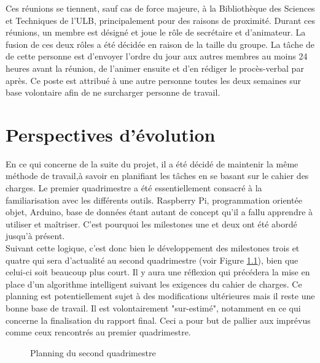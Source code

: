 \documentclass[11pt,a4paper,11pt]{report}
\begin{document}
	Ces réunions se tiennent, sauf cas de force majeure, à la Bibliothèque des Sciences et Techniques de l’ULB, principalement pour des raisons de proximité. Durant ces réunions, un membre est désigné et joue le rôle de secrétaire et d’animateur. La fusion de ces deux rôles a été décidée en raison de la taille du groupe. La tâche de de cette personne est d’envoyer l’ordre du jour aux autres membres au moins 24 heures avant la réunion, de l’animer ensuite et d’en rédiger le procès-verbal par après. Ce poste est attribué à une autre personne toutes les deux semaines sur base volontaire afin de ne surcharger personne de travail.\\
    
\newpage


\chapter{Perspectives d'évolution}

En ce qui concerne de la suite du projet, il a été décidé de maintenir la même méthode de travail,à savoir en planifiant les tâches en se basant sur le cahier des charges. Le premier quadrimestre a été essentiellement consacré à la familiarisation avec les différents outils. Raspberry Pi, programmation orientée objet, Arduino, base de données étant autant de concept qu'il a fallu apprendre à utiliser et maîtriser. C'est pourquoi les milestones une et deux ont été abordé jusqu'à présent. \\

Suivant cette logique, c'est donc bien le développement des milestones trois et quatre qui sera d'actualité au second quadrimestre (voir Figure \ref{planning}), bien que celui-ci soit beaucoup plus court. Il y aura une réflexion qui précédera la mise en place d'un algorithme intelligent suivant les exigences du cahier de charges. Ce planning est potentiellement sujet à des modifications ultérieures mais il reste une bonne base de travail. Il est volontairement "sur-estimé", notamment en ce qui concerne la finalisation du rapport final. Ceci a pour but de pallier aux imprévus comme ceux rencontrés au premier quadrimestre.\\ 



\newpage
\begin{figure}[h]



\caption{Planning du second quadrimestre}
\label{planning}


\end{figure}
\end{document}
